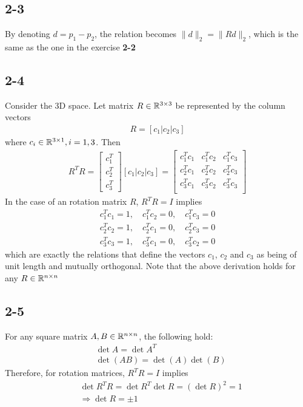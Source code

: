 \subsection*{2-3}

By denoting $d=p_1-p_2$, the relation becomes $\|d\|_2=\|Rd\|_2$, which is the same as the one in the exercise \textbf{2-2}

\subsection*{2-4}

Consider the 3D space. Let matrix $R\in \mathbb{R}^{3 \times 3}$ be represented by the column vectors
\begin{align*}
R = [ c_1 | c_2 | c_3 ]
\end{align*} 
where $c_i \space \in \mathbb{R}^{3 \times 1}, \space i=1,3$.
Then
\begin{align*}
R^T R = \left[\begin{array}{c} 
 c_1^T \\ 
 c_2^T \\ 
 c_3^T 
 \end{array} \right] \left[ c_1 | c_2 | c_3 \right] = \left[\begin{array}{ccc} 
 c_1^Tc_1 & c_1^Tc_2 & c_1^Tc_3 \\  
 c_2^Tc_1 & c_2^Tc_2 & c_2^Tc_3 \\ 
 c_3^Tc_1 & c_3^Tc_2 & c_3^Tc_3 \\ 
 \end{array}\right]
\end{align*}
In the case of an rotation matrix $R$, $R^TR=I$ implies 
\begin{align*}
 c_1^Tc_1 = 1, \quad c_1^Tc_2 = 0, \quad c_1^Tc_3 = 0 \\ 
  c_2^Tc_2 = 1, \quad c_2^Tc_1 = 0, \quad c_2^Tc_3 = 0 \\
   c_3^Tc_3 = 1, \quad c_3^Tc_1 = 0, \quad c_3^Tc_2 = 0
\end{align*}
which are exactly the relations that define the vectors $c_1$, $c_2$ and $c_3$ as being of unit length and mutually orthogonal. Note that the above derivation holds for any $R\in \mathbb{R}^{n\times n}$

\subsection*{2-5}
For any square matrix $A,B\in \mathbb{R}^{n \times n}$, the following hold:
\begin{align*}
&\det A = \det A^T \\
&\det(AB) = \det(A)\det(B)
\end{align*}
Therefore, for rotation matrices,  $R^T R = I $ implies
\begin{align*}
&\det R^TR= \det R^T \det R = (\det R)^2 = 1 \\
&\Rightarrow \det R = \pm 1
\end{align*} 

